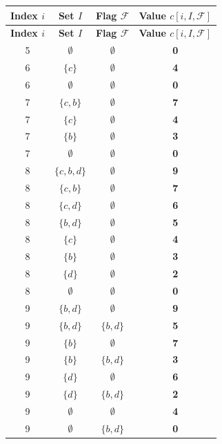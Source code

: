 \hfill
\begin{minipage}[t]{0.48\textwidth} %
    \centering
    \begin{longtable}{|c|c|c|c|}
        \hline
        \textbf{Index $i$} & \textbf{Set $I$} & \textbf{Flag $\mathcal{F}$} & \textbf{Value $c[i, I, \mathcal{F}]$} \\
        \hline
        \endfirsthead
        \hline
        \textbf{Index $i$} & \textbf{Set $I$} & \textbf{Flag $\mathcal{F}$} & \textbf{Value $c[i, I, \mathcal{F}]$} \\
        \hline
        \endhead
        \hline
        \endfoot

        5 & $\emptyset$ & $\emptyset$ & \textbf{0} \\
        \hline
        6 & $\{c\}$ & $\emptyset$ & \textbf{4} \\
        6 & $\emptyset$ & $\emptyset$ & \textbf{0} \\
        \hline
        7 & $\{c,b\}$ & $\emptyset$ & \textbf{7} \\
        7 & $\{c\}$ & $\emptyset$ & \textbf{4} \\
        7 & $\{b\}$ & $\emptyset$ & \textbf{3} \\
        7 & $\emptyset$ & $\emptyset$ & \textbf{0} \\
        \hline
        8 & $\{c,b,d\}$ & $\emptyset$ & \textbf{9} \\
        8 & $\{c,b\}$ & $\emptyset$ & \textbf{7} \\
        8 & $\{c,d\}$ & $\emptyset$ & \textbf{6} \\
        8 & $\{b,d\}$ & $\emptyset$ & \textbf{5} \\
        8 & $\{c\}$ & $\emptyset$ & \textbf{4} \\
        8 & $\{b\}$ & $\emptyset$ & \textbf{3} \\
        8 & $\{d\}$ & $\emptyset$ & \textbf{2} \\
        8 & $\emptyset$ & $\emptyset$ & \textbf{0} \\
        \hline
        9 & $\{b,d\}$ & $\emptyset$ & \textbf{9} \\
        9 & $\{b,d\}$ & $\{b,d\}$ & \textbf{5} \\
        9 & $\{b\}$ & $\emptyset$ & \textbf{7} \\
        9 & $\{b\}$ & $\{b,d\}$ & \textbf{3} \\
        9 & $\{d\}$ & $\emptyset$ & \textbf{6} \\
        9 & $\{d\}$ & $\{b,d\}$ & \textbf{2} \\
        9 & $\emptyset$ & $\emptyset$ & \textbf{4} \\
        9 & $\emptyset$ & $\{b,d\}$ & \textbf{0} \\
        \hline
    \end{longtable}
\end{minipage}

